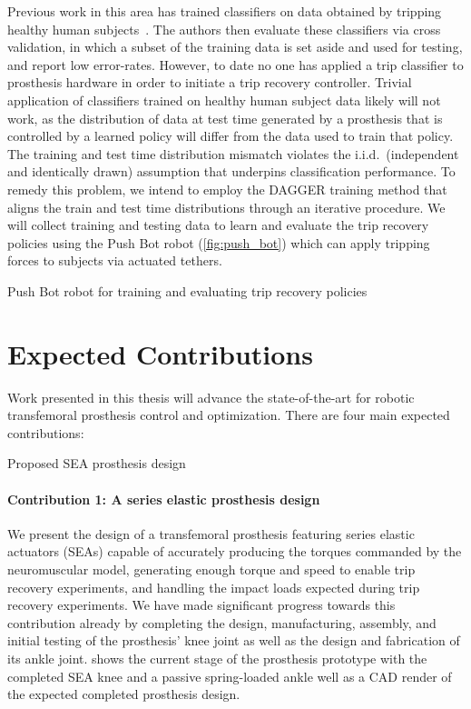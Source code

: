 Previous work in this area has trained classifiers on data obtained by tripping
healthy human subjects~\citep{lawson2010stumble, shirota2014recovery}. The
authors then evaluate these classifiers via cross validation, in which a subset
of the training data is set aside and used for testing, and report low
error-rates.  However, to date no one has applied a trip classifier to
prosthesis hardware in order to initiate a trip recovery controller. Trivial
application of classifiers trained on healthy human subject data likely will not
work, as the distribution of data at test time generated by a prosthesis that is
controlled by a learned policy will differ from the data used to train that
policy. The training and test time distribution mismatch violates the i.i.d.\
(independent and identically drawn) assumption that underpins classification
performance. To remedy this problem, we intend to employ the DAGGER training
method \citep{ross2011reduction} that aligns the train and test time
distributions through an iterative procedure. We will collect training and
testing data to learn and evaluate the trip recovery policies using the Push Bot
robot (\cref{fig:push_bot}) which can apply tripping forces to subjects via
actuated tethers.

\begin{marginfigure}[-3in]
    \centering
    \caption{Push Bot robot for training and evaluating trip recovery policies}
    \label{fig:push_bot}
\end{marginfigure}

\section{Expected Contributions}\label{sec:intro_contributions}

Work presented in this thesis will advance the state-of-the-art for robotic
transfemoral prosthesis control and optimization. There are four main expected 
contributions: 

\begin{marginfigure}
    \centering
    \caption{Proposed SEA prosthesis design}
    \label{fig:prosthesis_design}
\end{marginfigure}
\paragraph{Contribution 1: A series elastic prosthesis design} 
We present the design of a transfemoral prosthesis featuring series elastic
actuators (SEAs) capable of accurately producing the torques commanded by the
neuromuscular model, generating enough torque and speed to enable trip recovery
experiments, and handling the impact loads expected during trip recovery
experiments. We have made significant progress towards this contribution already
by completing the design, manufacturing, assembly, and initial testing of the
prosthesis' knee joint as well as the design and fabrication of its ankle joint.
\Cref{fig:prosthesis_design} shows the current stage of the prosthesis prototype
with the completed SEA knee and a passive spring-loaded ankle well as a CAD
render of the expected completed prosthesis design.

